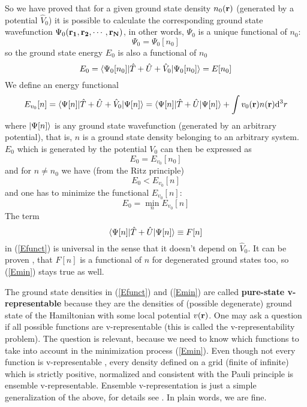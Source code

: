 So we have proved that for a given ground state density $n_0({\bf r})$ (generated by a potential $\hat V_0$) it is possible to calculate the corresponding ground state wavefunction $\Psi_0({\bf r_1},{\bf r_2},\cdots,{\bf r_N})$, in other words, $\Psi_0$ is a unique functional of $n_0$: 
\begin{equation*}
  \Psi_0=\Psi_0[n_0]
\end{equation*}
so the ground state energy $E_0$ is also a functional of $n_0$
\begin{equation*}
  E_0=\mathinner{\langle{\Psi_0[n_0]|\hat T+\hat U+\hat V_0|\Psi_0[n_0]}\rangle}=E[n_0]
\end{equation*}
We define an energy functional 
\begin{equation}
  E_{v_0}[n]=\mathinner{\langle{\Psi[n]|\hat T+\hat U+\hat V_0|\Psi[n]}\rangle}= \mathinner{\langle{\Psi[n]|\hat T+\hat U|\Psi[n]}\rangle}+\int v_0({\bf r})n({\bf r}){\rm d}^3r  \label{Efunct}
\end{equation}
where $\mathinner{|{\Psi[n]}\rangle}$ is any ground state wavefunction (generated by an arbitrary potential), that is, $n$ is a ground state density belonging to an arbitrary system. $E_0$ which is generated by the potential $V_0$ can then be expressed as 
\begin{equation*}
  E_0=E_{v_0}[n_0]
\end{equation*}
and for $n\neq n_0$ we have (from the Ritz principle) 
\begin{equation*}
  E_0<E_{v_0}[n]
\end{equation*}
and one has to minimize the functional $E_{v_0}[n]$: 
\begin{equation}
  E_0=\min_n E_{v_0}[n]  \label{Emin}
\end{equation}
The term 
\begin{equation*}
  \mathinner{\langle{\Psi[n]|\hat T+\hat U|\Psi[n]}\rangle}\equiv F[n]
\end{equation*}
in (\ref{Efunct}) is universal in the sense that it doesn't depend on $\hat V_0$. It can be proven \cite{DFT}, that $F[n]$ is a functional of $n$ for degenerated ground states too, so (\ref{Emin}) stays true as well.

The ground state densities in (\ref{Efunct}) and (\ref{Emin}) are called \textbf{pure-state v-representable} because they are the densities of (possible degenerate) ground state of the Hamiltonian with some local potential $v({\bf r})$. One may ask a question if all possible functions are v-representable (this is called the v-representability problem). The question is relevant, because we need to know which functions to take into account in the minimization process (\ref{Emin}). Even though not every function is v-representable \cite{DFT}, every density defined on a grid (finite of infinite) which is strictly positive, normalized and consistent with the Pauli principle is ensemble v-representable. Ensemble v-representation is just a simple generalization of the above, for details see \cite{DFT}. In plain words, we are fine.

